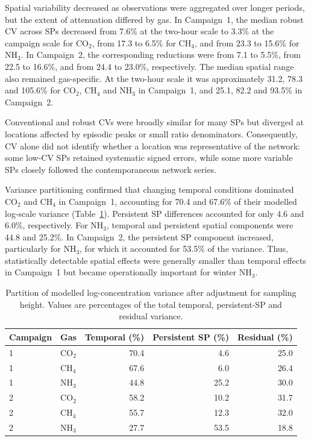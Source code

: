 \documentclass[12pt,a4paper]{article}
\begin{document}
Spatial variability decreased as observations were aggregated over longer periods, but the extent of attenuation differed by gas. In Campaign~1, the median robust CV across SPs decreased from 7.6\% at the two-hour scale to 3.3\% at the campaign scale for \(\mathrm{CO_2}\), from 17.3 to 6.5\% for \(\mathrm{CH_4}\), and from 23.3 to 15.6\% for \(\mathrm{NH_3}\). In Campaign~2, the corresponding reductions were from 7.1 to 5.5\%, from 22.5 to 16.6\%, and from 24.4 to 23.0\%, respectively. The median spatial range also remained gas-specific. At the two-hour scale it was approximately 31.2, 78.3 and 105.6\% for \(\mathrm{CO_2}\), \(\mathrm{CH_4}\) and \(\mathrm{NH_3}\) in Campaign~1, and 25.1, 82.2 and 93.5\% in Campaign~2.

Conventional and robust CVs were broadly similar for many SPs but diverged at locations affected by episodic peaks or small ratio denominators. Consequently, CV alone did not identify whether a location was representative of the network: some low-CV SPs retained systematic signed errors, while some more variable SPs closely followed the contemporaneous network series.

Variance partitioning confirmed that changing temporal conditions dominated \(\mathrm{CO_2}\) and \(\mathrm{CH_4}\) in Campaign~1, accounting for 70.4 and 67.6\% of their modelled log-scale variance (Table~\ref{tab:variance}). Persistent SP differences accounted for only 4.6 and 6.0\%, respectively. For \(\mathrm{NH_3}\), temporal and persistent spatial components were 44.8 and 25.2\%. In Campaign~2, the persistent SP component increased, particularly for \(\mathrm{NH_3}\), for which it accounted for 53.5\% of the variance. Thus, statistically detectable spatial effects were generally smaller than temporal effects in Campaign~1 but became operationally important for winter \(\mathrm{NH_3}\).

\begin{table}[htbp]
\centering
\caption{Partition of modelled log-concentration variance after adjustment for sampling height. Values are percentages of the total temporal, persistent-SP and residual variance.}
\label{tab:variance}
\small
\begin{tabular}{llrrr}
\toprule
Campaign & Gas & Temporal (\%) & Persistent SP (\%) & Residual (\%)\\
\midrule
1 & \(\mathrm{CO_2}\) & 70.4 & 4.6 & 25.0\\
1 & \(\mathrm{CH_4}\) & 67.6 & 6.0 & 26.4\\
1 & \(\mathrm{NH_3}\) & 44.8 & 25.2 & 30.0\\
2 & \(\mathrm{CO_2}\) & 58.2 & 10.2 & 31.7\\
2 & \(\mathrm{CH_4}\) & 55.7 & 12.3 & 32.0\\
2 & \(\mathrm{NH_3}\) & 27.7 & 53.5 & 18.8\\
\bottomrule
\end{tabular}
\end{table}
\end{document}

